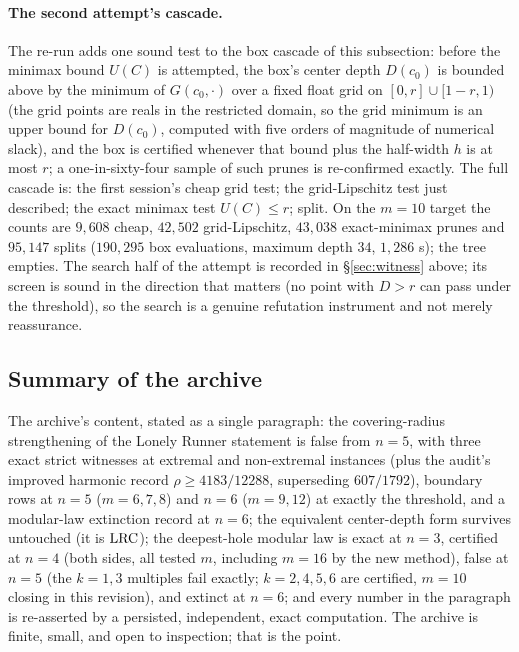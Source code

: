 \paragraph{The second attempt's cascade.}
The re-run adds one sound test to the box cascade of this subsection:
before the minimax bound $U(C)$ is attempted, the box's center depth
$D(c_0)$ is bounded above by the minimum of $G(c_0,\cdot)$ over a
fixed float grid on $[0,r]\cup[1-r,1)$ (the grid points are reals in
the restricted domain, so the grid minimum is an upper bound for
$D(c_0)$, computed with five orders of magnitude of numerical slack),
and the box is certified whenever that bound plus the half-width $h$
is at most $r$; a one-in-sixty-four sample of such prunes is
re-confirmed exactly. The full cascade is: the first session's cheap
grid test; the grid-Lipschitz test just described; the exact minimax
test $U(C)\le r$; split. On the $m=10$ target the counts are
$9{,}608$ cheap, $42{,}502$ grid-Lipschitz, $43{,}038$ exact-minimax
prunes and $95{,}147$ splits ($190{,}295$ box evaluations, maximum
depth $34$, $1{,}286$ s); the tree empties. The search half of the
attempt is recorded in \S\ref{sec:witness} above; its screen is sound
in the direction that matters (no point with $D>r$ can pass under the
threshold), so the search is a genuine refutation instrument and not
merely reassurance.

\subsection{Summary of the archive}

The archive's content, stated as a single paragraph: the
covering-radius strengthening of the Lonely Runner statement is false
from $n=5$, with three exact strict witnesses at extremal and
non-extremal instances (plus the audit's improved harmonic record
$\rho\ge4183/12288$, superseding $607/1792$), boundary rows at
$n=5$ ($m=6,7,8$) and $n=6$ ($m=9,12$) at exactly the threshold, and a
modular-law extinction record at $n=6$; the equivalent
center-depth form survives untouched (it is $\mathrm{LRC}$); the deepest-hole
modular law is exact at $n=3$, certified at $n=4$ (both sides, all
tested $m$, including $m=16$ by the new method), false at $n=5$ (the
$k=1,3$ multiples fail exactly; $k=2,4,5,6$ are certified, $m=10$
closing in this revision), and extinct at $n=6$; and every number in the paragraph is
re-asserted by a persisted, independent, exact computation. The archive
is finite, small, and open to inspection; that is the point.
